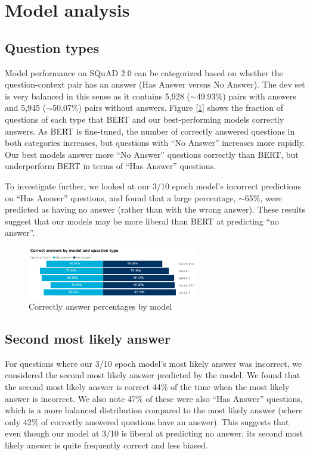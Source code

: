 \section{Model analysis}

\subsection{Question types}

Model performance on SQuAD 2.0 can be categorized based on whether the question-context pair has an answer (Has Answer versus No Answer). The dev set is very balanced in this sense as it contains 5,928 ($\sim$49.93\%) pairs with answers and 5,945 ($\sim$50.07\%) pairs without answers. Figure [\ref{fig:qa_correct_answers_by_model_and_type}] shows the fraction of questions of each type that BERT and our best-performing models correctly answers. As BERT is fine-tuned, the number of correctly answered questions in both categories increases, but questions with “No Answer” increases more rapidly. Our best models answer more “No Answer” questions correctly than BERT, but underperform BERT in terms of “Has Answer” questions.

To investigate further, we looked at our 3/10 epoch model’s incorrect predictions on “Has Answer” questions, and found that a large percentage, $\sim$65\%, were predicted as having no answer (rather than with the wrong answer). These results suggest that our models may be more liberal than BERT at predicting “no answer”.

\begin{figure}[ht]
	\centering
	\includegraphics[width=7.5cm]{images/QA_Correct_Answers_by_Question_Type.png}
	\caption{\label{fig:qa_correct_answers_by_model_and_type}Correctly answer percentages by model}
\end{figure}

\subsection{Second most likely answer}

For questions where our 3/10 epoch model’s most likely answer was incorrect, we considered the second most likely answer predicted by the model. We found that the second most likely answer is correct 44\% of the time when the most likely answer is incorrect. We also note 47\% of these were also “Has Answer” questions, which is a more balanced distribution compared to the most likely answer (where only 42\% of correctly answered questions have an answer). This suggests that even though our model at 3/10 is liberal at predicting no answer, its second most likely answer is quite frequently correct and less biased. 

